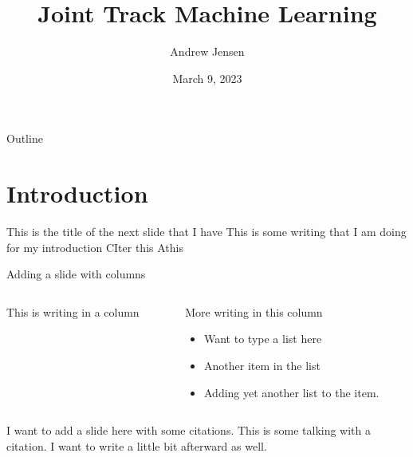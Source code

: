 \documentclass[presentation]{beamer}
\author{Andrew Jensen}
\date{March 9, 2023}
\title{Joint Track Machine Learning}
\begin{document}
\maketitle
\begin{frame}{Outline}
\tableofcontents
\end{frame}


\section{Introduction}
\label{sec:orgd827ada}
\begin{frame}[label={sec:orgad2f780}]{This is the title of the next slide that I have}
This is some writing that I am doing for my introduction
CIter this
Athis
\end{frame}

\begin{frame}[label={sec:orgf143620}]{Adding a slide with columns}
\begin{columns}
\begin{column}{0.4\columnwidth}
This is writing in a column
\end{column}
\begin{column}{0.47\columnwidth}
More writing in this column
\begin{itemize}
\item Want to type a list here
\item Another item in the list
\item Adding yet another list to the item.
\end{itemize}
\end{column}
\end{columns}
\end{frame}
\begin{frame}[label={sec:org59c63e9}]{I want to add a slide here with some citations.}
This is some talking with a citation\autocite{jensenJointTrackMachine2022}. I want to write a little bit afterward as well.
\end{frame}
\end{document}
